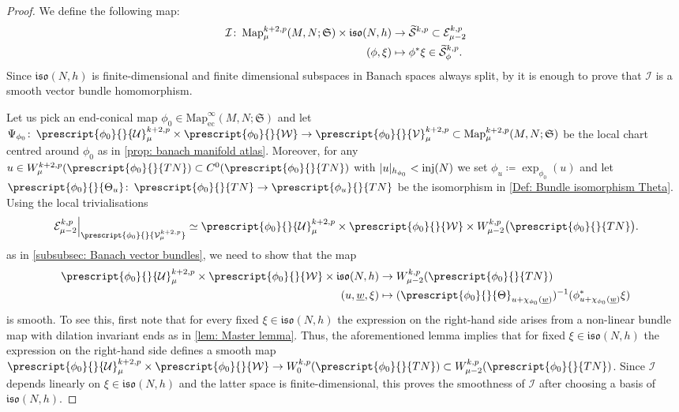 \documentclass{article}
\numberwithin{equation}{section}        %
\theoremstyle{bfnote}
\theoremstyle{definition}
\theoremstyle{bfremark}
\newcommand{\col}{\colon \thinspace}        %
\newcommand{\Map}{\mathrm{Map}}             %
\begin{document}
\begin{proof}
    We define the following map: 
    \begin{align*}
        \mathcal{I} \col \Map^{k+2,p}_{\mu}(M,N;\mathfrak{S}) \times \mathfrak{iso}(N,h) &\to \widetilde{\mathcal{S}}^{k,p}\subset \mathcal{E}^{k,p}_{\mu-2} \\
        (\phi,\xi) &\mapsto \phi^*\xi \in \widetilde{\mathcal{S}}_{\phi}^{k,p}.
    \end{align*}
    Since $\mathfrak{iso}(N,h)$ is finite-dimensional and finite dimensional subspaces in Banach spaces always split, by \cite[Proposition~3.1 in Chapter~3]{Lang1999DifferentialGeometry} it is enough to prove that $\mathcal{I}$ is a smooth vector bundle homomorphism. 

    Let us pick an end-conical map $\phi_0 \in \Map^\infty_{\mathrm{ec}}(M,N;\mathfrak{S})$ and let $\Psi_{\phi_0} \col \prescript{\phi_0}{}{\mathcal{U}}^{k+2,p}_{\mu} \times \prescript{\phi_0}{}{\mathcal{W}} \to \prescript{\phi_0}{}{\mathcal{V}}^{k+2,p}_\mu \subset \Map^{k+2,p}_\mu(M,N;\mathfrak{S})$ be the local chart centred around $\phi_0$ as in \cref{prop: banach manifold atlas}. Moreover, for any $u \in W^{k+2,p}_{\mu}(\prescript{\phi_0}{}{TN}) \subset C^0(\prescript{\phi_0}{}{TN})$ with $\vert u \vert_{h_{\phi_0}}< \textup{inj}(N)$ we set $\phi_u \coloneqq \exp_{\phi_0}(u)$ and let $\prescript{\phi_0}{}{\Theta_u} \col \prescript{\phi_0}{}{TN} \to \prescript{\phi_u}{}{TN}$ be the isomorphism in \cref{Def: Bundle isomorphism Theta}. Using the local trivialisations 
    \begin{equation*}
        \left. \mathcal{E}^{k,p}_{\mu-2} \right|_{\prescript{\phi_0}{}{\mathcal{V}^{k+2,p}_\mu}} \simeq \prescript{\phi_0}{}{\mathcal{U}}^{k+2,p}_{\mu} \times \prescript{\phi_0}{}{\mathcal{W}} \times W^{k,p}_{\mu-2}\big(\prescript{\phi_0}{}{TN}\big) .
    \end{equation*}
    as in \cref{subsubsec: Banach vector bundles}, we need to show that the map 
    \begin{align*}
        \prescript{\phi_0}{}{\mathcal{U}}^{k+2,p}_{\mu} \times \prescript{\phi_0}{}{\mathcal{W}} \times \mathfrak{iso}(N,h) & \to  W^{k,p}_{\mu-2}(\prescript{\phi_0}{}{TN}) \\
        (u,\underline{w},\xi) &\mapsto (\prescript{\phi_0}{}{\Theta}_{u+\chi_{\phi_0}(\underline{w})})^{-1}(\phi_{u+\chi_{\phi_0}(\underline{w})}^*\xi)
    \end{align*}
    is smooth. To see this, first note that for every fixed $\xi \in \mathfrak{iso}(N,h)$ the expression on the right-hand side arises from a non-linear bundle map with dilation invariant ends as in \cref{lem: Master lemma}. Thus, the aforementioned lemma implies that for fixed $\xi \in \mathfrak{iso}(N,h)$ the expression on the right-hand side defines a smooth map $\prescript{\phi_0}{}{\mathcal{U}}^{k+2,p}_{\mu} \times \prescript{\phi_0}{}{\mathcal{W}} \to W^{k,p}_{0}(\prescript{\phi_0}{}{TN}) \subset W^{k,p}_{\mu-2}(\prescript{\phi_0}{}{TN})$. Since $\mathcal{I}$ depends linearly on $\xi \in \mathfrak{iso}(N,h)$ and the latter space is finite-dimensional, this proves the smoothness of $\mathcal{I}$ after choosing a basis of $\mathfrak{iso}(N,h)$.
\end{proof}
\end{document}

